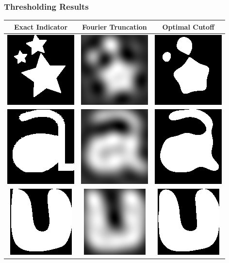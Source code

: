 \documentclass{beamer}
\begin{document}
\begin{frame}
\frametitle{Thresholding Results}
\begin{center}
\centering
\begin{tabular}{|c|c|c|}
\hline
Exact Indicator & 
Fourier Truncation & 
Optimal Cutoff \\
\hline
\includegraphics[height=.5in]{figures/fig_ind0.png} & 
\includegraphics[height=.5in]{figures/fig_ift0.png} & 
\includegraphics[height=.5in]{figures/fig_cut0.png} \\
\hline
\includegraphics[height=.5in]{figures/fig_ind1.png} & 
\includegraphics[height=.5in]{figures/fig_ift1.png} & 
\includegraphics[height=.5in]{figures/fig_cut1.png} \\
\hline
\includegraphics[height=.5in]{figures/fig_ind2.png} & 
\includegraphics[height=.5in]{figures/fig_ift2.png} & 
\includegraphics[height=.5in]{figures/fig_cut2.png} \\

\end{tabular}
\end{center}
\end{frame}
\end{document}
